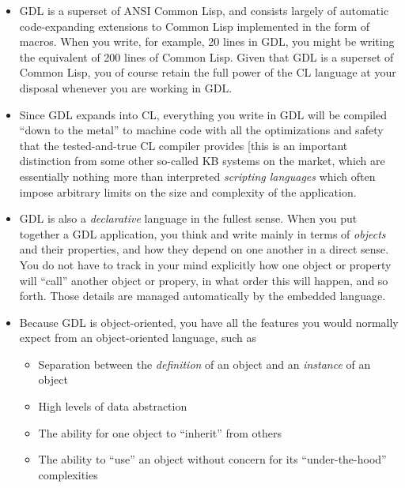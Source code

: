 \documentclass [11pt]{book}
\begin{document}
\begin{itemize}

\item GDL is a superset of ANSI Common Lisp, and consists largely of
automatic code-expanding extensions to Common Lisp implemented in the
form of macros. When you write, for example, 20 lines in GDL, you
might be writing the equivalent of 200 lines of Common Lisp. Given
that GDL is a superset of Common Lisp, you of course retain the
full power of the CL language at your disposal whenever you are
working in GDL.
\item Since GDL expands into CL, everything you write in GDL will
be compiled ``down to the metal'' to machine code with all the
optimizations and safety that the tested-and-true CL compiler provides
[this is an important distinction from some other so-called KB systems
on the market, which are essentially nothing more than interpreted \emph{scripting languages} which often impose arbitrary limits on
the size and complexity of the application.

\item GDL is also a \emph{declarative} language in the fullest sense. When you put together a
GDL application, you think and write mainly in terms of \emph{objects} and their properties, and how they depend on one another
in a direct sense. You do not have to track in your mind explicitly
how one object or property will ``call'' another object or propery, in
what order this will happen, and so forth. Those details are managed
automatically by the embedded language.

\item Because GDL is object-oriented, you have all the features you would normally expect
from an object-oriented language, such as 

\begin{itemize}

\item Separation between the \emph{definition} of an object and an \emph{instance} of an object

\item High levels of data abstraction

\item The ability for one object to ``inherit'' from others

\item The ability to ``use'' an object without concern for
	its ``under-the-hood'' complexities


\end{itemize}
\end{itemize}
\end{document}
